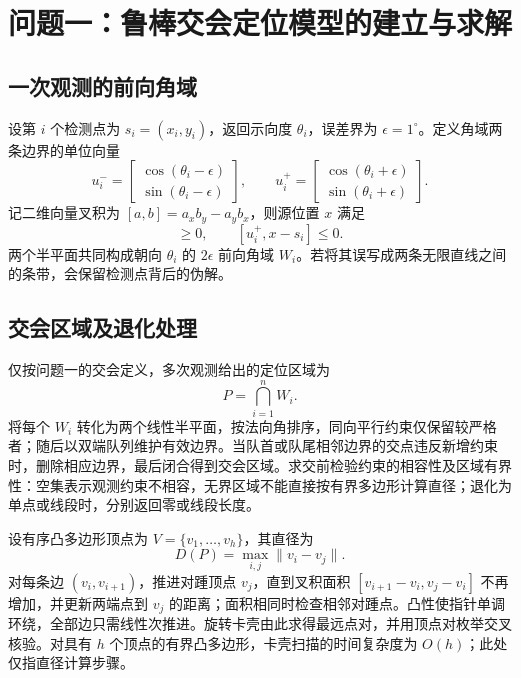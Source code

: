 \section{问题一：鲁棒交会定位模型的建立与求解}

\subsection{一次观测的前向角域}
设第 $i$ 个检测点为 $s_i=(x_i,y_i)$，返回示向度 $\theta_i$，误差界为 $\epsilon=1^\circ$。定义角域两条边界的单位向量
\begin{equation}
  u_i^-=
  \begin{bmatrix}\cos(\theta_i-\epsilon)\\ \sin(\theta_i-\epsilon)\end{bmatrix},
  \qquad
  u_i^+=
  \begin{bmatrix}\cos(\theta_i+\epsilon)\\ \sin(\theta_i+\epsilon)\end{bmatrix}.
\end{equation}
记二维向量叉积为 $[a,b]=a_xb_y-a_yb_x$，则源位置 $x$ 满足
\begin{equation}
  [u_i^-,x-s_i]\geq0,
  \qquad
  [u_i^+,x-s_i]\leq0.
  \label{eq:wedge-halfplanes}
\end{equation}
两个半平面共同构成朝向 $\theta_i$ 的 $2\epsilon$ 前向角域 $W_i$。若将其误写成两条无限直线之间的条带，会保留检测点背后的伪解。

\subsection{交会区域及退化处理}
仅按问题一的交会定义，多次观测给出的定位区域为
\begin{equation}
  P=\bigcap_{i=1}^{n}W_i.
  \label{eq:q1-intersection}
\end{equation}
将每个 $W_i$ 转化为两个线性半平面，按法向角排序，同向平行约束仅保留较严格者；随后以双端队列维护有效边界。当队首或队尾相邻边界的交点违反新增约束时，删除相应边界，最后闭合得到交会区域。求交前检验约束的相容性及区域有界性：空集表示观测约束不相容，无界区域不能直接按有界多边形计算直径；退化为单点或线段时，分别返回零或线段长度。

设有序凸多边形顶点为 $V=\{v_1,\ldots,v_h\}$，其直径为
\begin{equation}
  D(P)=\max_{i,j}\|v_i-v_j\|.
\end{equation}
对每条边 $(v_i,v_{i+1})$，推进对踵顶点 $v_j$，直到叉积面积 $[v_{i+1}-v_i,v_j-v_i]$ 不再增加，并更新两端点到 $v_j$ 的距离；面积相同时检查相邻对踵点。凸性使指针单调环绕，全部边只需线性次推进。旋转卡壳由此求得最远点对，并用顶点对枚举交叉核验\cite{toussaint1983}。对具有 $h$ 个顶点的有界凸多边形，卡壳扫描的时间复杂度为 $O(h)$；此处仅指直径计算步骤。

